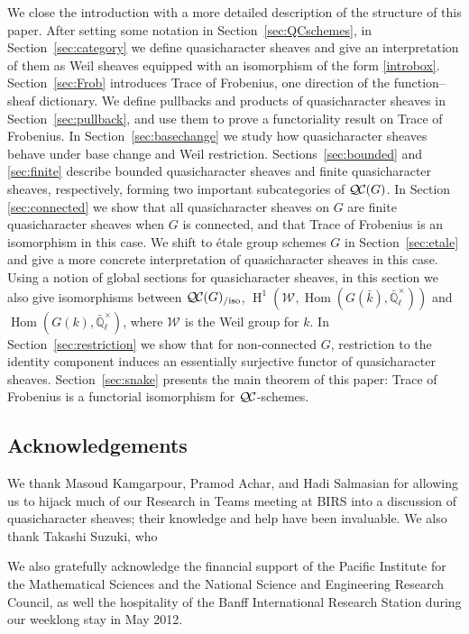 \documentclass{amsart}
\theoremstyle{plain}
\theoremstyle{definition}
\theoremstyle{remark}
\newcommand{\EE}{\mathbb{\bar Q}_\ell}
\newcommand{\bFq}{\bar{k}}
\newcommand{\Fq}{k}
\newcommand{\EEx}{\EE^\times}
\newcommand{\Weil}[1]{\mathcal{W}_{#1}}
\DeclareMathOperator{\Hom}{Hom}
\DeclareMathOperator{\Hh}{H}
\newcommand{\QC}{{\mathcal{Q\hskip-0.8pt C}}}
\newcommand{\QCiso}[1]{\QC(#1)_{/\text{iso}}}
\begin{document}
We close the introduction with a more detailed description of the structure of this paper.
After setting some notation in Section~\ref{sec:QCschemes}, in Section~\ref{sec:category} we define quasicharacter sheaves and give an interpretation of
them as Weil sheaves equipped with an isomorphism of the form  \eqref{introbox}.
Section~\ref{sec:Frob} introduces Trace of Frobenius,
one direction of the function--sheaf dictionary.
We define pullbacks and products of quasicharacter sheaves in Section~\ref{sec:pullback}, and use
them to prove a functoriality result on Trace of Frobenius.
In Section~\ref{sec:basechange} we study how quasicharacter sheaves behave under base change
and Weil restriction.
Sections~\ref{sec:bounded} and \ref{sec:finite} describe bounded quasicharacter sheaves and finite quasicharacter sheaves, respectively,
forming two important subcategories of $\QC(G)$.
In Section \ref{sec:connected} we show that all quasicharacter sheaves on $G$ are finite quasicharacter sheaves when $G$ is connected, and that Trace of Frobenius is an isomorphism in this case.
We shift to \'etale group schemes $G$ in Section~\ref{sec:etale} and give a more concrete interpretation
of quasicharacter sheaves in this case.  Using a notion of global sections for quasicharacter sheaves, in this section
we also give isomorphisms between $\QCiso{G}$, $\Hh^1(\Weil{}, \Hom(G(\bFq), \EEx))$ and $\Hom(G(\Fq), \EEx)$, where $\Weil{}$ is the Weil group for $\Fq$.
In Section~\ref{sec:restriction} we show that for non-connected $G$, restriction to the identity component
induces an essentially surjective functor of quasicharacter sheaves.
Section~\ref{sec:snake} presents the main theorem of this paper: Trace of Frobenius
is a functorial isomorphism for $\QC$-schemes.

\subsection*{Acknowledgements}
We thank Masoud Kamgarpour, Pramod Achar, and Hadi Salmasian
for allowing us to hijack much of our Research in Teams meeting at BIRS into a discussion of
quasicharacter sheaves; their knowledge and help have been invaluable.
We also thank Takashi Suzuki, who

We also gratefully acknowledge the financial support of the Pacific Institute for the Mathematical Sciences
and the National Science and Engineering Research Council,
as well the hospitality of the Banff International Research Station during our weeklong stay in May 2012.
\end{document}
